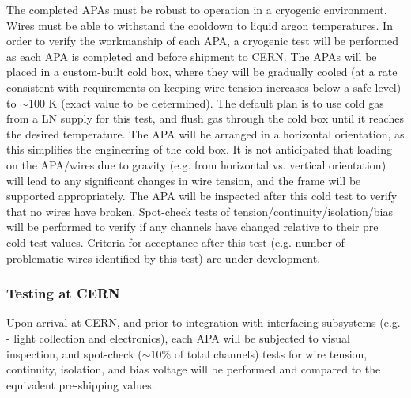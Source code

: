 The completed APAs must be robust to operation in a cryogenic environment.  Wires must be able to withstand the cooldown to liquid argon temperatures.  In order to verify the workmanship of each APA, a cryogenic test will be performed as each APA is completed and before shipment to CERN.  The APAs will be placed in a custom-built cold box, where they will be gradually cooled (at a rate consistent with requirements on keeping wire tension increases below a safe level) to $\sim$100 K (exact value to be determined).  The default plan is to use cold gas from a LN supply for this test, and flush gas through the cold box until it reaches the desired temperature.  The APA will be arranged in a horizontal orientation, as this simplifies the engineering of the cold box.  It is not anticipated that loading on the APA/wires due to gravity (e.g. from horizontal vs. vertical orientation) will lead to any significant changes in wire tension, and the frame will be supported appropriately.  The APA will be inspected after this cold test to verify that no wires have broken.  Spot-check tests of tension/continuity/isolation/bias will be performed to verify if any channels have changed relative to their pre cold-test values.  Criteria for acceptance after this test (e.g. number of problematic wires identified by this test) are under development.


\subsubsection{Testing at CERN}

Upon arrival at CERN, and prior to integration with interfacing subsystems (e.g. - light collection and electronics), each APA will be subjected to visual inspection, and spot-check ($\sim$10$\%$ of total channels) tests for wire tension, continuity, isolation, and bias voltage will be performed and compared to the equivalent pre-shipping values.




%


